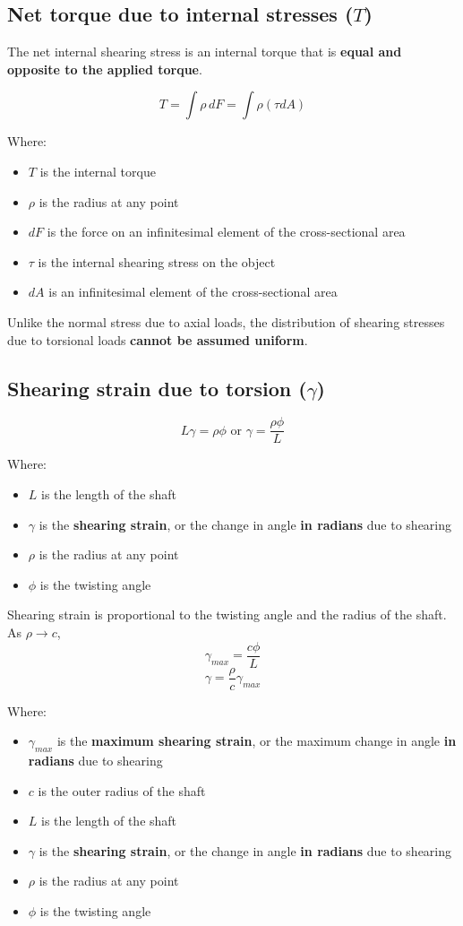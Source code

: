 \documentclass[11pt]{article}
\begin{document}
\subsection{Net torque due to internal stresses (\(T\))}
\label{sec:org6b96c68}
The net internal shearing stress is an internal torque that is \textbf{equal and opposite to the applied torque}.

\[T = \int \rho \, dF = \int \rho (\tau dA)\]

Where:
\begin{itemize}
\item \(T\) is the internal torque
\item \(\rho\) is the radius at any point
\item \(dF\) is the force on an infinitesimal element of the cross-sectional area
\item \(\tau\) is the internal shearing stress on the object
\item \(dA\) is an infinitesimal element of the cross-sectional area
\end{itemize}

Unlike the normal stress due to axial loads, the distribution of shearing stresses due to torsional loads \textbf{cannot be assumed uniform}.

\newpage

\subsection{Shearing strain due to torsion (\(\gamma\))}
\label{sec:org02c11be}
\[L \gamma = \rho \phi \text{ or } \gamma = \frac{\rho \phi}{L}\]

Where:
\begin{itemize}
\item \(L\) is the length of the shaft
\item \(\gamma\) is the \textbf{shearing strain}, or the change in angle \textbf{in radians} due to shearing
\item \(\rho\) is the radius at any point
\item \(\phi\) is the twisting angle
\end{itemize}

Shearing strain is proportional to the twisting angle and the radius of the shaft.
\\[0pt]

As \(\rho \rightarrow c\),
\[\gamma_{max} = \frac{c \phi}{L}\]
\[\gamma = \frac{\rho}{c} \gamma_{max}\]

Where:
\begin{itemize}
\item \(\gamma_{max}\) is the \textbf{maximum shearing strain}, or the maximum change in angle \textbf{in radians} due to shearing
\item \(c\) is the outer radius of the shaft
\item \(L\) is the length of the shaft
\item \(\gamma\) is the \textbf{shearing strain}, or the change in angle \textbf{in radians} due to shearing
\item \(\rho\) is the radius at any point
\item \(\phi\) is the twisting angle
\end{itemize}
\end{document}
